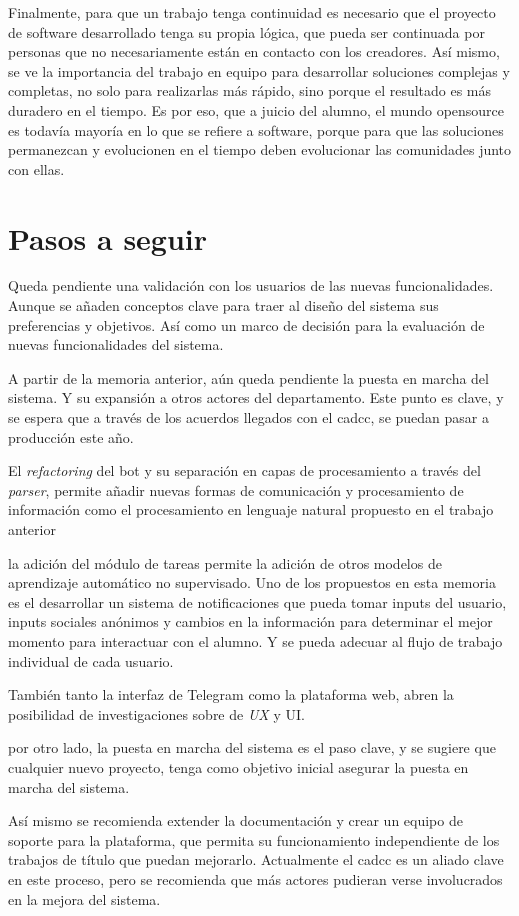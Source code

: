     \par Finalmente, para que un trabajo tenga continuidad es necesario que el proyecto de software desarrollado tenga su propia lógica, que pueda ser continuada por personas que no necesariamente están en contacto con los creadores. Así mismo, se ve la importancia del trabajo en equipo para desarrollar soluciones complejas y completas, no solo para realizarlas más rápido, sino porque el resultado es más duradero en el tiempo. Es por eso, que a juicio del alumno, el mundo opensource es todavía mayoría en lo que se refiere a software, porque para que las soluciones permanezcan y evolucionen en el tiempo deben evolucionar las comunidades junto con ellas.

\section{Pasos a seguir}
    \par Queda pendiente una validación con los usuarios de las nuevas funcionalidades. Aunque se añaden conceptos clave para traer al diseño del sistema sus preferencias y objetivos. Así como un marco de decisión para la evaluación de nuevas funcionalidades del sistema.
    \par A partir de la memoria anterior, aún queda pendiente la puesta en marcha del sistema. Y su expansión a otros actores del departamento. Este punto es clave, y se espera que a través de los acuerdos llegados con el \acrshort{cadcc}, se puedan pasar a producción este año.
    \par El \textit{refactoring} del bot y su separación en capas de procesamiento a través del \textit{parser}, permite añadir nuevas formas de comunicación y procesamiento de información como el procesamiento en lenguaje natural propuesto en el trabajo anterior \cite{ARANCIBIA2021}
    \par la adición del módulo de tareas permite la adición de otros modelos de aprendizaje automático no supervisado. Uno de los propuestos en esta memoria es el desarrollar un sistema de notificaciones que pueda tomar inputs del usuario, inputs sociales anónimos y cambios en la información para determinar el mejor momento para interactuar con el alumno. Y se pueda adecuar al flujo de trabajo individual de cada usuario.
    \par También tanto la interfaz de \gls{Telegram} como la plataforma web, abren la posibilidad de investigaciones sobre de \textit{UX} y {UI}.
    \par por otro lado, la puesta en marcha del sistema es el paso clave, y se sugiere que cualquier nuevo proyecto, tenga como objetivo inicial asegurar la puesta en marcha del sistema. 
    \par Así mismo se recomienda extender la documentación y crear un equipo de soporte para la plataforma, que permita su funcionamiento independiente de los trabajos de título que puedan mejorarlo. Actualmente el \acrshort{cadcc} es un aliado clave en este proceso, pero se recomienda que más actores pudieran verse involucrados en la mejora del sistema.
